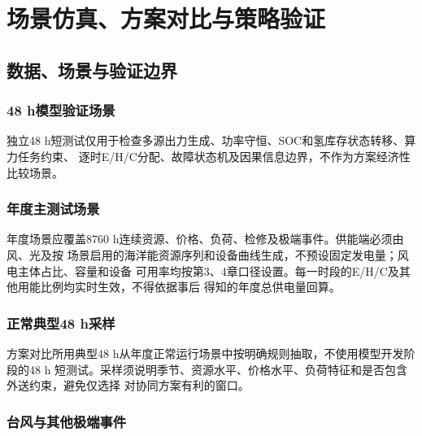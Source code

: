 \chapter{场景仿真、方案对比与策略验证}

\noindent{}

\section{数据、场景与验证边界}

\subsection{48 h模型验证场景}

独立48 h短测试仅用于检查多源出力生成、功率守恒、SOC和氢库存状态转移、算力任务约束、
逐时E/H/C分配、故障状态机及因果信息边界，不作为方案经济性比较场景。


\subsection{年度主测试场景}

年度场景应覆盖8760 h连续资源、价格、负荷、检修及极端事件。供能端必须由风、光及按
场景启用的海洋能资源序列和设备曲线生成，不预设固定发电量；风电主体占比、容量和设备
可用率均按第3、4章口径设置。每一时段的E/H/C及其他用能比例均实时生效，不得依据事后
得知的年度总供电量回算。


\subsection{正常典型48 h采样}

方案对比所用典型48 h从年度正常运行场景中按明确规则抽取，不使用模型开发阶段的48 h
短测试。采样须说明季节、资源水平、价格水平、负荷特征和是否包含外送约束，避免仅选择
对协同方案有利的窗口。


\subsection{台风与其他极端事件}

